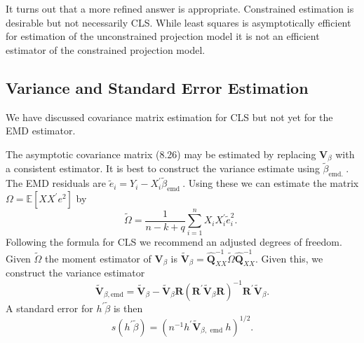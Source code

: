 \documentclass[10pt]{article}
\begin{document}
It turns out that a more refined answer is appropriate. Constrained estimation is desirable but not necessarily CLS. While least squares is asymptotically efficient for estimation of the unconstrained projection model it is not an efficient estimator of the constrained projection model.

\subsection{Variance and Standard Error Estimation}
We have discussed covariance matrix estimation for CLS but not yet for the EMD estimator.

The asymptotic covariance matrix (8.26) may be estimated by replacing $\boldsymbol{V}_{\beta}$ with a consistent estimator. It is best to construct the variance estimate using $\widetilde{\beta}_{\text {emd. }}$. The EMD residuals are $\widetilde{e}_{i}=Y_{i}-X_{i}^{\prime} \widetilde{\beta}_{\text {emd }}$. Using these we can estimate the matrix $\Omega=\mathbb{E}\left[X X^{\prime} e^{2}\right]$ by
$$
\widetilde{\Omega}=\frac{1}{n-k+q} \sum_{i=1}^{n} X_{i} X_{i}^{\prime} \widetilde{e}_{i}^{2} \text {. }
$$
Following the formula for CLS we recommend an adjusted degrees of freedom. Given $\widetilde{\Omega}$ the moment estimator of $\boldsymbol{V}_{\beta}$ is $\widetilde{\boldsymbol{V}}_{\beta}=\widehat{\boldsymbol{Q}}_{X X}^{-1} \widetilde{\Omega} \widehat{\boldsymbol{Q}}_{X X}^{-1}$. Given this, we construct the variance estimator
$$
\widetilde{\boldsymbol{V}}_{\beta, \mathrm{emd}}=\widetilde{\boldsymbol{V}}_{\beta}-\widetilde{\boldsymbol{V}}_{\beta} \boldsymbol{R}\left(\boldsymbol{R}^{\prime} \widetilde{\boldsymbol{V}}_{\beta} \boldsymbol{R}\right)^{-1} \boldsymbol{R}^{\prime} \widetilde{\boldsymbol{V}}_{\beta} .
$$
A standard error for $h^{\prime} \widetilde{\beta}$ is then
$$
s\left(h^{\prime} \widetilde{\beta}\right)=\left(n^{-1} h^{\prime} \widetilde{\boldsymbol{V}}_{\beta, \text { emd }} h\right)^{1 / 2} .
$$
\end{document}
